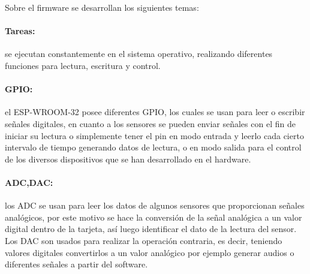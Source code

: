 

Sobre el firmware se desarrollan los siguientes temas:

\paragraph{Tareas:}

se ejecutan constantemente en el sistema operativo, realizando diferentes funciones para lectura, escritura y control.

\paragraph{GPIO:}

el ESP-WROOM-32 posee diferentes GPIO, los cuales se usan para leer o escribir señales digitales, en cuanto a los sensores se pueden enviar señales con el fin de iniciar su lectura o simplemente tener el pin en modo entrada y leerlo cada cierto intervalo de tiempo generando datos de lectura, o en modo salida para el control de los diversos dispositivos que se han desarrollado en el hardware.

\paragraph{ADC,DAC:}

los ADC se usan para leer los datos de algunos sensores que proporcionan señales analógicos, por este motivo se hace la conversión de la señal analógica a un valor digital dentro de la tarjeta, así luego identificar el dato de la lectura del sensor. Los DAC son usados para realizar la operación contraria, es decir, teniendo valores digitales convertirlos a un valor analógico por ejemplo generar audios o diferentes señales a partir del software.


